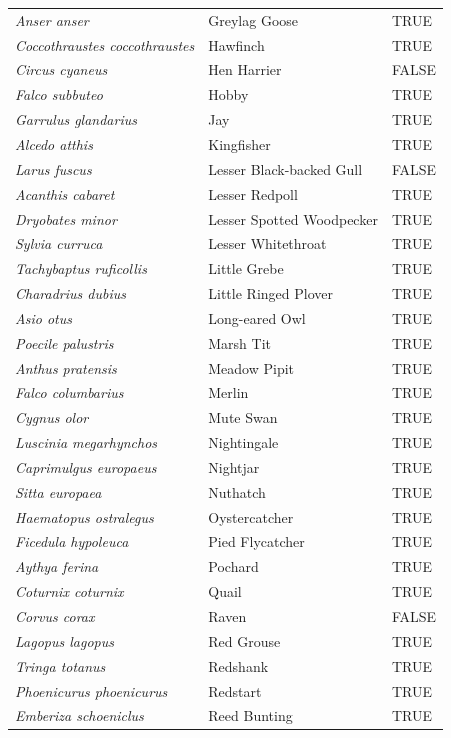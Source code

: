 \documentclass[
]{article}
\begin{document}
\begin{longtable}[]{@{}lll@{}}
\textit{Anser anser} & Greylag Goose & TRUE \\
\textit{Coccothraustes coccothraustes} & Hawfinch & TRUE \\
\textit{Circus cyaneus} & Hen Harrier & FALSE \\
\textit{Falco subbuteo} & Hobby & TRUE \\
\textit{Garrulus glandarius} & Jay & TRUE \\
\textit{Alcedo atthis} & Kingfisher & TRUE \\
\textit{Larus fuscus} & Lesser Black-backed Gull & FALSE \\
\textit{Acanthis cabaret} & Lesser Redpoll & TRUE \\
\textit{Dryobates minor} & Lesser Spotted Woodpecker & TRUE \\
\textit{Sylvia curruca} & Lesser Whitethroat & TRUE \\
\textit{Tachybaptus ruficollis} & Little Grebe & TRUE \\
\textit{Charadrius dubius} & Little Ringed Plover & TRUE \\
\textit{Asio otus} & Long-eared Owl & TRUE \\
\textit{Poecile palustris} & Marsh Tit & TRUE \\
\textit{Anthus pratensis} & Meadow Pipit & TRUE \\
\textit{Falco columbarius} & Merlin & TRUE \\
\textit{Cygnus olor} & Mute Swan & TRUE \\
\textit{Luscinia megarhynchos} & Nightingale & TRUE \\
\textit{Caprimulgus europaeus} & Nightjar & TRUE \\
\textit{Sitta europaea} & Nuthatch & TRUE \\
\textit{Haematopus ostralegus} & Oystercatcher & TRUE \\
\textit{Ficedula hypoleuca} & Pied Flycatcher & TRUE \\
\textit{Aythya ferina} & Pochard & TRUE \\
\textit{Coturnix coturnix} & Quail & TRUE \\
\textit{Corvus corax} & Raven & FALSE \\
\textit{Lagopus lagopus} & Red Grouse & TRUE \\
\textit{Tringa totanus} & Redshank & TRUE \\
\textit{Phoenicurus phoenicurus} & Redstart & TRUE \\
\textit{Emberiza schoeniclus} & Reed Bunting & TRUE \\

\end{longtable}
\end{document}

